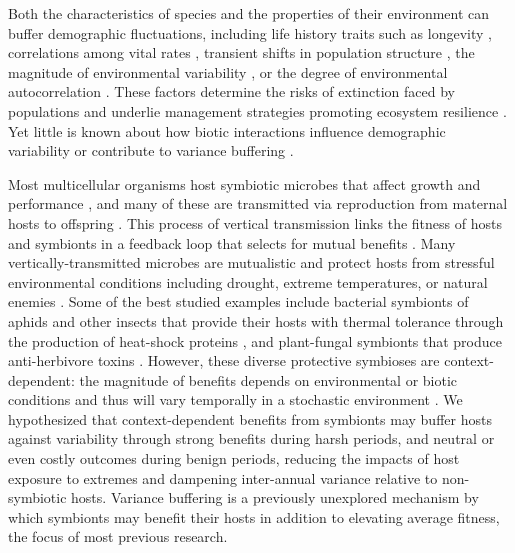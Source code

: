 \documentclass[9pt,twocolumn,twoside]{pnas-new}
\begin{document}
Both the characteristics of species and the properties of their environment can buffer demographic fluctuations, including life history traits such as longevity \cite{pfister1998patterns, morris2008longevity}, correlations among vital rates \cite{compagnoni2016effect}, transient shifts in population structure \cite{ellis2013role}, the magnitude of environmental variability \cite{rodriguez2021limits}, or the degree of environmental autocorrelation \cite{tuljapurkar1980population,fieberg2001stochastic}. 
These factors determine the risks of extinction faced by populations \cite{menges2000applications} and underlie management strategies promoting ecosystem resilience \cite{kuparinen2016fishing}. 
Yet little is known about how biotic interactions influence demographic variability or contribute to variance buffering \cite{hilde_demographic_2020}. 

Most multicellular organisms host symbiotic microbes that affect growth and performance \cite{rodriguez2009fungal,mcfall2013animals}, and many of these are transmitted via reproduction from maternal hosts to offspring \cite{funkhouser2013mom}.
This process of vertical transmission links the fitness of hosts and symbionts in a feedback loop that selects for mutual benefits \cite{fine1975vectors}.
Many vertically-transmitted microbes are mutualistic and protect hosts from stressful environmental conditions including drought, extreme temperatures, or natural enemies \cite{russell2006costs, kivlin2013fungal}. 
Some of the best studied examples include bacterial symbionts of aphids and other insects that provide their hosts with thermal tolerance through the production of heat-shock proteins \cite{dunbar2007aphid}, and plant-fungal symbionts that produce anti-herbivore toxins \cite{reyna2012detection,saikkonen2013chemical,neyaz2022localization}.
However, these diverse protective symbioses are context-dependent: the magnitude of benefits depends on environmental or biotic conditions \cite{chamberlain2014context} and thus will vary temporally in a stochastic environment \cite{jordano1994spatial}.
We hypothesized that context-dependent benefits from symbionts may buffer hosts against variability through strong benefits during harsh periods, and neutral or even costly outcomes during benign periods, reducing the impacts of host exposure to extremes and dampening inter-annual variance relative to non-symbiotic hosts.
Variance buffering is a previously unexplored mechanism by which symbionts may benefit their hosts in addition to elevating average fitness, the focus of most previous research. 
\end{document}
